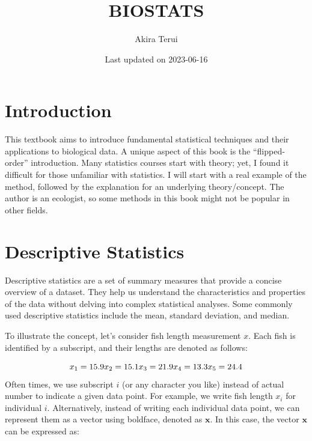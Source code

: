 \documentclass[
]{book}
\title{BIOSTATS}
\author{Akira Terui}
\date{Last updated on 2023-06-16}
\begin{document}
\maketitle

{
\setcounter{tocdepth}{1}
\tableofcontents
}
\hypertarget{introduction}{%
\chapter*{Introduction}\label{introduction}}

This textbook aims to introduce fundamental statistical techniques and their applications to biological data. A unique aspect of this book is the ``flipped-order'' introduction. Many statistics courses start with theory; yet, I found it difficult for those unfamiliar with statistics. I will start with a real example of the method, followed by the explanation for an underlying theory/concept. The author is an ecologist, so some methods in this book might not be popular in other fields.

\hypertarget{descriptive-statistics}{%
\chapter{Descriptive Statistics}\label{descriptive-statistics}}

Descriptive statistics are a set of summary measures that provide a concise overview of a dataset. They help us understand the characteristics and properties of the data without delving into complex statistical analyses. Some commonly used descriptive statistics include the mean, standard deviation, and median.

To illustrate the concept, let's consider fish length measurement \(x\). Each fish is identified by a subscript, and their lengths are denoted as follows:

\[
x_1 = 15.9\\
x_2 = 15.1\\
x_3 = 21.9\\
x_4 = 13.3\\
x_5 = 24.4\\
\]Often times, we use subscript \(i\) (or any character you like) instead of actual number to indicate a given data point. For example, we write fish length \(x_i\) for individual \(i\). Alternatively, instead of writing each individual data point, we can represent them as a vector using boldface, denoted as \(\pmb{x}\). In this case, the vector \(\pmb{x}\) can be expressed as:
\end{document}
